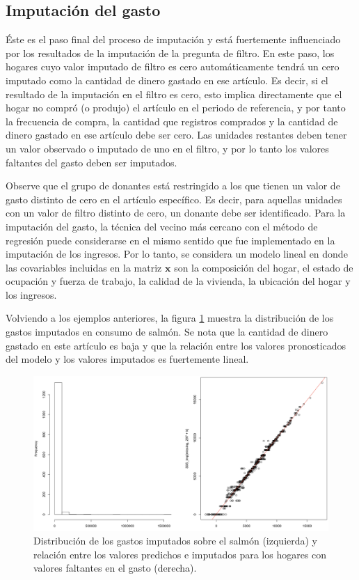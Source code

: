 \documentclass[
  12pt,
  spanish,
]{book}
\begin{document}
\hypertarget{imputaciuxf3n-del-gasto}{%
\subsection{Imputación del gasto}\label{imputaciuxf3n-del-gasto}}

Éste es el paso final del proceso de imputación y está fuertemente influenciado por los resultados de la imputación de la pregunta de filtro. En este paso, los hogares cuyo valor imputado de filtro es cero automáticamente tendrá un cero imputado como la cantidad de dinero gastado en ese artículo. Es decir, si el resultado de la imputación en el filtro es cero, esto implica directamente que el hogar no compró (o produjo) el artículo en el periodo de referencia, y por tanto la frecuencia de compra, la cantidad que registros comprados y la cantidad de dinero gastado en ese artículo debe ser cero. Las unidades restantes deben tener un valor observado o imputado de uno en el filtro, y por lo tanto los valores faltantes del gasto deben ser imputados.

Observe que el grupo de donantes está restringido a los que tienen un valor de gasto distinto de cero en el artículo específico. Es decir, para aquellas unidades con un valor de filtro distinto de cero, un donante debe ser identificado. Para la imputación del gasto, la técnica del vecino más cercano con el método de regresión puede considerarse en el mismo sentido que fue implementado en la imputación de los ingresos. Por lo tanto, se considera un modelo lineal en donde las covariables incluidas en la matriz \(\mathbf{x}\) son la composición del hogar, el estado de ocupación y fuerza de trabajo, la calidad de la vivienda, la ubicación del hogar y los ingresos.

Volviendo a los ejemplos anteriores, la figura \ref{fig:fig13} muestra la distribución de los gastos imputados en consumo de salmón. Se nota que la cantidad de dinero gastado en este artículo es baja y que la relación entre los valores pronosticados del modelo y los valores imputados es fuertemente lineal.

\begin{figure}
\includegraphics[width=0.5\linewidth]{Pics/13} \caption{Distribución de los gastos imputados sobre el salmón (izquierda) y relación entre los valores predichos e imputados para los hogares con valores faltantes en el gasto (derecha).}\label{fig:fig13}
\end{figure}
\end{document}
